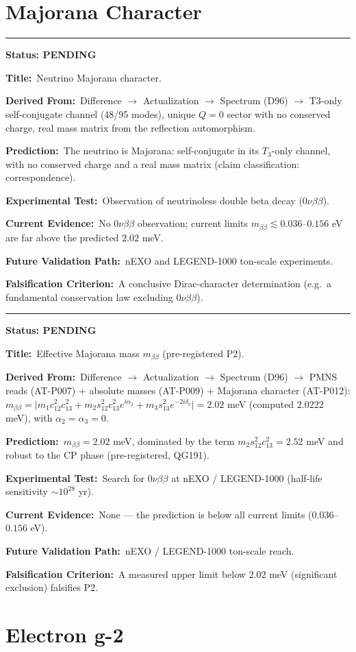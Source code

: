 \documentclass[11pt,a4paper]{article}
\newcommand{\predstart}[2]{%
  \par\medskip\noindent\hrule\par\smallskip
  \noindent{\large\bfseries #1}\hfill{\bfseries Status: #2}\par\smallskip
}
\newcommand{\pfield}[2]{%
  \noindent\textbf{#1:}~#2\par\smallskip
}
\begin{document}
\section{Majorana Character}
\label{sec:majorana}

\predstart{AT-P012}{PENDING}
\pfield{Title}{Neutrino Majorana character.}
\pfield{Derived From}{Difference $\to$ Actualization $\to$ Spectrum (D96) $\to$ T3-only
self-conjugate channel (48/95 modes), unique $Q=0$ sector with no conserved charge, real
mass matrix from the reflection automorphism.}
\pfield{Prediction}{The neutrino is Majorana: self-conjugate in its $T_3$-only channel, with
no conserved charge and a real mass matrix (claim classification: correspondence).}
\pfield{Experimental Test}{Observation of neutrinoless double beta decay ($0\nu\beta\beta$).}
\pfield{Current Evidence}{No $0\nu\beta\beta$ observation; current limits
$m_{\beta\beta} \lesssim 0.036$--$0.156$ eV are far above the predicted $2.02$ meV.}
\pfield{Future Validation Path}{nEXO and LEGEND-1000 ton-scale experiments.}
\pfield{Falsification Criterion}{A conclusive Dirac-character determination (e.g.\ a
fundamental conservation law excluding $0\nu\beta\beta$).}

\predstart{AT-P013}{PENDING}
\pfield{Title}{Effective Majorana mass $m_{\beta\beta}$ (pre-registered P2).}
\pfield{Derived From}{Difference $\to$ Actualization $\to$ Spectrum (D96) $\to$ PMNS reads
(AT-P007) + absolute masses (AT-P009) + Majorana character (AT-P012): $m_{\beta\beta} =
\bigl|m_1c_{12}^2c_{13}^2 + m_2s_{12}^2c_{13}^2e^{i\alpha_2} +
m_3s_{13}^2e^{-2i\delta_\nu}\bigr| = 2.02$ meV (computed $2.0222$ meV), with
$\alpha_2 = \alpha_3 = 0$.}
\pfield{Prediction}{$m_{\beta\beta} = 2.02$ meV, dominated by the term
$m_2 s_{12}^2 c_{13}^2 = 2.52$ meV and robust to the CP phase (pre-registered, QG191).}
\pfield{Experimental Test}{Search for $0\nu\beta\beta$ at nEXO / LEGEND-1000 (half-life
sensitivity $\sim10^{28}$ yr).}
\pfield{Current Evidence}{None --- the prediction is below all current limits
($0.036$--$0.156$ eV).}
\pfield{Future Validation Path}{nEXO / LEGEND-1000 ton-scale reach.}
\pfield{Falsification Criterion}{A measured upper limit below $2.02$ meV (significant
exclusion) falsifies P2.}

\section{Electron g-2}
\label{sec:g2}
\end{document}
